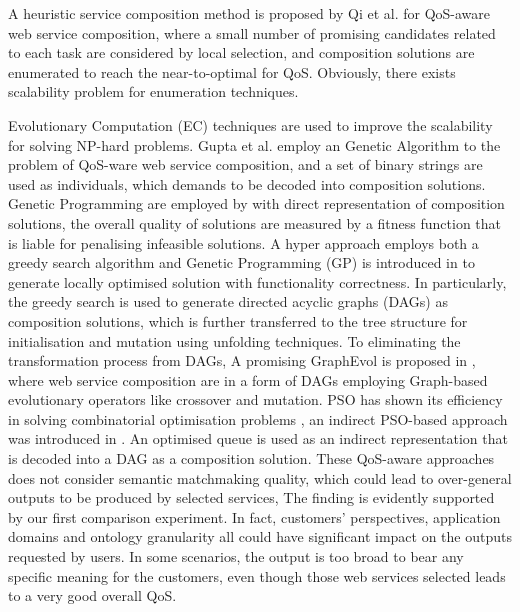 \documentclass{llncs}
\begin{document}
A heuristic service composition method is proposed by Qi et al. \cite{qi2010combining} for QoS-aware web service composition, where a small number of promising candidates related to each task are considered by local selection, and composition solutions are enumerated to reach the near-to-optimal for QoS. Obviously, there exists scalability problem for enumeration techniques. 

Evolutionary Computation (EC) techniques are used to improve the scalability for solving NP-hard problems. Gupta et al. \cite{gupta2015optimization} employ an Genetic Algorithm to the problem of QoS-ware web service composition, and a set of binary strings are used as individuals, which demands to be decoded into composition solutions. Genetic Programming are employed by  \cite{yu2013adaptive} with direct representation of composition solutions, the overall quality of solutions are measured by a fitness function that is liable for penalising infeasible solutions. A hyper approach employs both a greedy search algorithm and Genetic Programming (GP) is introduced in \cite{ma2015hybrid} to generate locally optimised solution with functionality correctness. In particularly, the greedy search is used to generate  directed acyclic graphs (DAGs) as composition solutions, which is further transferred to the tree structure for initialisation and mutation using unfolding techniques. To eliminating the transformation process from DAGs, A promising GraphEvol is proposed in \cite{da2015graphevol}, where web service composition are in a form of DAGs employing Graph-based evolutionary operators like crossover and mutation. PSO has shown its efficiency in solving combinatorial optimisation problems \cite{fukuyama2008fundamentals}, an indirect PSO-based approach was introduced in \cite{da2016particle}. An optimised queue is used as an indirect representation that is decoded into a DAG as a composition solution. These QoS-aware approaches does not consider semantic matchmaking quality, which could lead to over-general outputs to be produced by selected services, The finding is evidently supported by our first comparison experiment. In fact, customers' perspectives, application domains and ontology granularity all could have significant impact on the outputs requested by users. In some scenarios, the output is too broad to bear any specific meaning for the customers, even though those web services selected leads to a very good overall QoS.
\end{document}
